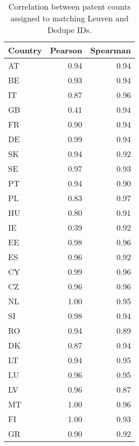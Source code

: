 \begin{table}[ht]
\centering
\begin{tabular}{lrr}
  \hline
Country & Pearson & Spearman \\ 
  \hline
AT & 0.94 & 0.94 \\ 
  BE & 0.93 & 0.94 \\ 
  IT & 0.87 & 0.96 \\ 
  GB & 0.41 & 0.94 \\ 
  FR & 0.90 & 0.94 \\ 
  DE & 0.99 & 0.94 \\ 
  SK & 0.94 & 0.92 \\ 
  SE & 0.97 & 0.93 \\ 
  PT & 0.94 & 0.90 \\ 
  PL & 0.83 & 0.97 \\ 
  HU & 0.80 & 0.91 \\ 
  IE & 0.39 & 0.92 \\ 
  EE & 0.98 & 0.96 \\ 
  ES & 0.96 & 0.92 \\ 
  CY & 0.99 & 0.96 \\ 
  CZ & 0.96 & 0.96 \\ 
  NL & 1.00 & 0.95 \\ 
  SI & 0.98 & 0.94 \\ 
  RO & 0.94 & 0.89 \\ 
  DK & 0.87 & 0.94 \\ 
  LT & 0.94 & 0.95 \\ 
  LU & 0.96 & 0.95 \\ 
  LV & 0.96 & 0.87 \\ 
  MT & 1.00 & 0.96 \\ 
  FI & 1.00 & 0.93 \\ 
  GR & 0.90 & 0.92 \\ 
   \hline
\end{tabular}
\caption{Correlation between patent counts assigned to matching Leuven and Dedupe IDs.} 
\label{tab:patent_count_corr}
\end{table}
